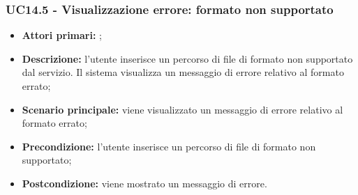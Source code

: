 \subsubsection{UC14.5 - Visualizzazione errore: formato non supportato}
\begin{itemize}
	\item \textbf{Attori primari:} \us{};
	\item \textbf{Descrizione:} l’utente inserisce un percorso di file di formato non supportato dal servizio. Il sistema visualizza un messaggio di errore relativo al formato errato;
	\item \textbf{Scenario principale:} viene visualizzato un messaggio di errore relativo al formato errato;
	\item \textbf{Precondizione:} l'utente inserisce un percorso di file di formato non supportato;
	\item \textbf{Postcondizione:} viene mostrato un messaggio di errore. 
\end{itemize}